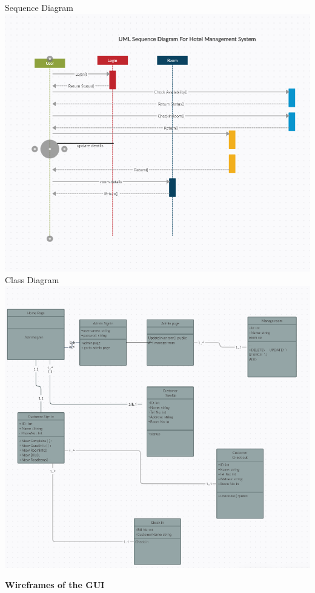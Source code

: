 \documentclass[a4paper,12pt]{report}
\begin{document}
Sequence Diagram\\
\includegraphics[scale=0.5]{SD.png}\\
Class Diagram\\
\includegraphics[scale=0.35]{CD.png}
\newpage

\begin{flushleft}
		\textbf{Wireframes of the GUI}
	\end{flushleft}
\end{document}
